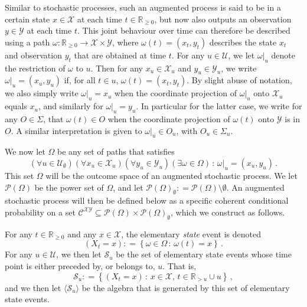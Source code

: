 \documentclass[twoside,11pt]{article}
\newcommand{\reals}{\mathbb{R}}
\newcommand{\realsnonneg}{\reals_{\geq 0}}
\newcommand{\states}{\mathcal{X}}
\newcommand{\observs}{\mathcal{Y}}
\newcommand{\coloneqq}{:\!=}
\begin{document}
Similar to stochastic processes, such an augmented process is said to be in a certain state $x\in\states$ at each time $t\in\realsnonneg$, but now also outputs an observation $y\in\observs$ at each time $t$. This joint behaviour over time can therefore be described using a path $\omega:\realsnonneg\to\states\times\observs$, where $\omega(t)=(x_t,y_t)$ describes the state $x_t$ and observation $y_t$ that are obtained at time $t$. For any $u\in\mathcal{U}$, we let $\omega\vert_u$ denote the restriction of $\omega$ to $u$. Then for any $x_u\in\states_u$ and $y_u\in\observs_u$, we write $\omega\vert_u=(x_u,y_u)$ if, for all $t\in u$, $\omega(t)=(x_t,y_t)$. By slight abuse of notation, we also simply write $\omega\vert_u=x_u$ when the coordinate projection of $\omega\vert_u$ onto $\states_u$ equals $x_u$, and similarly for $\omega\vert_u=y_u$. In particular for the latter case, we write for any $O\in\Sigma$, that $\omega(t)\in O$ when the coordinate projection of $\omega(t)$ onto $\observs$ is in $O$. A similar interpretation is given to $\omega\vert_u \in O_u$, with $O_u\in\Sigma_u$.

We now let $\Omega$ be any set of paths that satisfies
\begin{equation}\label{eq:paths_big_enough}
(\forall u\in\mathcal{U}_\emptyset)(\forall x_u\in\states_u)(\forall y_u\in\observs_u)(\exists \omega\in\Omega)\,:\,\omega\vert_u=(x_u,y_u)\,.
\end{equation}
This set $\Omega$ will be the outcome space of an augmented stochastic process. We let $\mathcal{P}(\Omega)$ be the power set of $\Omega$, and let $\mathcal{P}(\Omega)_\emptyset\coloneqq \mathcal{P}(\Omega)\setminus\emptyset$. An augmented stochastic process will then be defined below as a specific coherent conditional probability on a set $\mathcal{C}^{\states\observs}\subseteq \mathcal{P}(\Omega)\times \mathcal{P}(\Omega)_\emptyset $, which we construct as follows.

For any $t\in\realsnonneg$ and any $x\in\states$, the elementary \emph{state} event is denoted
\begin{equation*}
(X_t=x) \coloneqq \left\{ \omega\in\Omega\,:\,\omega(t)=x \right\}\,.
\end{equation*}
For any $u\in\mathcal{U}$, we then let $\mathcal{S}_u$ be the set of elementary state events whose time point is either preceded by, or belongs to, $u$. That is,
\begin{equation*}
\mathcal{S}_u \coloneqq \left\{ (X_t=x)\,:\, x\in\states,\, t\in\reals_{>u}\cup u \right\}\,,
\end{equation*}
and we then let $\langle\mathcal{S}_u\rangle$ be the algebra that is generated by this set of elementary state events.
\end{document}
